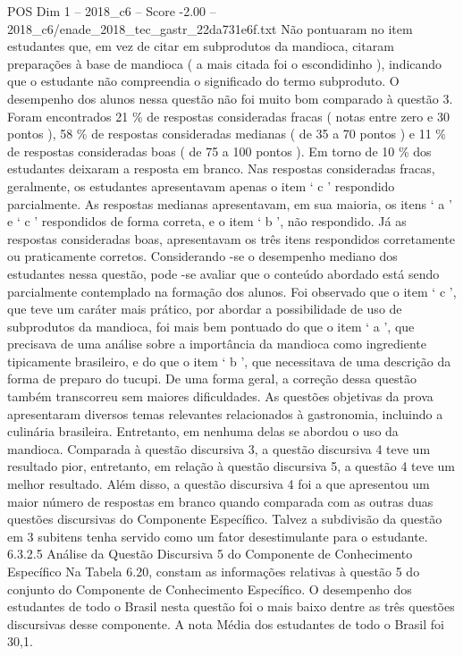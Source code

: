 \begin{textsample}{POS Dim 1 – 2018\_c6 – Score -2.00 – 2018\_c6/enade\_2018\_tec\_gastr\_22da731e6f.txt}
Não pontuaram no item estudantes que, em vez de citar em subprodutos da mandioca, citaram preparações à base de mandioca ( a mais citada foi o escondidinho ), indicando que o estudante não compreendia o significado do termo subproduto.
O desempenho dos alunos nessa questão não foi muito bom comparado à questão 3.
Foram encontrados 21 \% de respostas consideradas fracas ( notas entre zero e 30 pontos ), 58 \% de respostas consideradas medianas ( de 35 a 70 pontos ) e 11 \% de respostas consideradas boas ( de 75 a 100 pontos ).
Em torno de 10 \% dos estudantes deixaram a resposta em branco.
Nas respostas consideradas fracas, geralmente, os estudantes apresentavam apenas o item ‘ c ’ respondido parcialmente.
As respostas medianas apresentavam, em sua maioria, os itens ‘ a ’ e ‘ c ’ respondidos de forma correta, e o item ‘ b ’, não respondido.
Já as respostas consideradas boas, apresentavam os três itens respondidos corretamente ou praticamente corretos.
Considerando -se o desempenho mediano dos estudantes nessa questão, pode -se avaliar que o conteúdo abordado está sendo parcialmente contemplado na formação dos alunos.
Foi observado que o item ‘ c ’, que teve um caráter mais prático, por abordar a possibilidade de uso de subprodutos da mandioca, foi mais bem pontuado do que o item ‘ a ’, que precisava de uma análise sobre a importância da mandioca como ingrediente tipicamente brasileiro, e do que o item ‘ b ’, que necessitava de uma descrição da forma de preparo do tucupi.
De uma forma geral, a correção dessa questão também transcorreu sem maiores dificuldades.
As questões objetivas da prova apresentaram diversos temas relevantes relacionados à gastronomia, incluindo a culinária brasileira.
Entretanto, em nenhuma delas se abordou o uso da mandioca.
Comparada à questão discursiva 3, a questão discursiva 4 teve um resultado pior, entretanto, em relação à questão discursiva 5, a questão 4 teve um melhor resultado.
Além disso, a questão discursiva 4 foi a que apresentou um maior número de respostas em branco quando comparada com as outras duas questões discursivas do Componente Específico.
Talvez a subdivisão da questão em 3 subitens tenha servido como um fator desestimulante para o estudante. 6.3.2.5 Análise da Questão Discursiva 5 do Componente de Conhecimento Específico Na Tabela 6.20, constam as informações relativas à questão 5 do conjunto do Componente de Conhecimento Específico.
O desempenho dos estudantes de todo o Brasil nesta questão foi o mais baixo dentre as três questões discursivas desse componente.
A nota Média dos estudantes de todo o Brasil foi 30,1.

\end{textsample}
